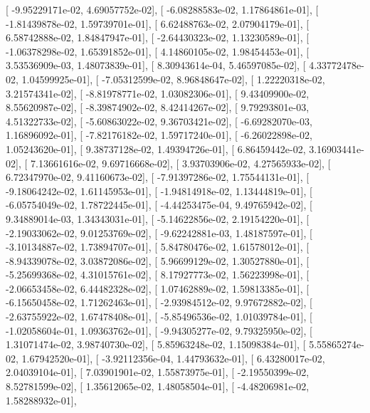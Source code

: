 \documentclass{article}
\begin{document}
       [ -9.95229171e-02,   4.69057752e-02],
       [ -6.08288583e-02,   1.17864861e-01],
       [ -1.81439878e-02,   1.59739701e-01],
       [  6.62488763e-02,   2.07904179e-01],
       [  6.58742888e-02,   1.84847947e-01],
       [ -2.64430323e-02,   1.13230589e-01],
       [ -1.06378298e-02,   1.65391852e-01],
       [  4.14860105e-02,   1.98454453e-01],
       [  3.53536909e-03,   1.48073839e-01],
       [  8.30943614e-04,   5.46597085e-02],
       [  4.33772478e-02,   1.04599925e-01],
       [ -7.05312599e-02,   8.96848647e-02],
       [  1.22220318e-02,   3.21574341e-02],
       [ -8.81978771e-02,   1.03082306e-01],
       [  9.43409900e-02,   8.55620987e-02],
       [ -8.39874902e-02,   8.42414267e-02],
       [  9.79293801e-03,   4.51322733e-02],
       [ -5.60863022e-02,   9.36703421e-02],
       [ -6.69282070e-03,   1.16896092e-01],
       [ -7.82176182e-02,   1.59717240e-01],
       [ -6.26022898e-02,   1.05243620e-01],
       [  9.38737128e-02,   1.49394726e-01],
       [  6.86459442e-02,   3.16903441e-02],
       [  7.13661616e-02,   9.69716668e-02],
       [  3.93703906e-02,   4.27565933e-02],
       [  6.72347970e-02,   9.41160673e-02],
       [ -7.91397286e-02,   1.75544131e-01],
       [ -9.18064242e-02,   1.61145953e-01],
       [ -1.94814918e-02,   1.13444819e-01],
       [ -6.05754049e-02,   1.78722445e-01],
       [ -4.44253475e-04,   9.49765942e-02],
       [  9.34889014e-03,   1.34343031e-01],
       [ -5.14622856e-02,   2.19154220e-01],
       [ -2.19033062e-02,   9.01253769e-02],
       [ -9.62242881e-03,   1.48187597e-01],
       [ -3.10134887e-02,   1.73894707e-01],
       [  5.84780476e-02,   1.61578012e-01],
       [ -8.94339078e-02,   3.03872086e-02],
       [  5.96699129e-02,   1.30527880e-01],
       [ -5.25699368e-02,   4.31015761e-02],
       [  8.17927773e-02,   1.56223998e-01],
       [ -2.06653458e-02,   6.44482328e-02],
       [  1.07462889e-02,   1.59813385e-01],
       [ -6.15650458e-02,   1.71262463e-01],
       [ -2.93984512e-02,   9.97672882e-02],
       [ -2.63755922e-02,   1.67478408e-01],
       [ -5.85496536e-02,   1.01039784e-01],
       [ -1.02058604e-01,   1.09363762e-01],
       [ -9.94305277e-02,   9.79325950e-02],
       [  1.31071474e-02,   3.98740730e-02],
       [  5.85963248e-02,   1.15098384e-01],
       [  5.55865274e-02,   1.67942520e-01],
       [ -3.92112356e-04,   1.44793632e-01],
       [  6.43280017e-02,   2.04039104e-01],
       [  7.03901901e-02,   1.55873975e-01],
       [ -2.19550399e-02,   8.52781599e-02],
       [  1.35612065e-02,   1.48058504e-01],
       [ -4.48206981e-02,   1.58288932e-01],
\end{document}
